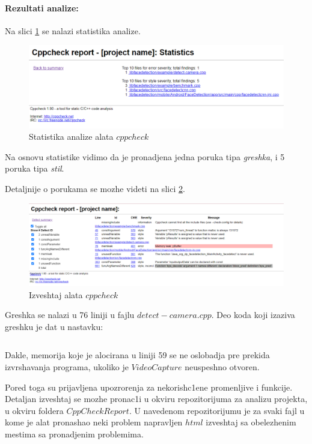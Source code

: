 \documentclass{article}
\begin{document}
\paragraph{Rezultati analize:}
Na slici \ref{stats:cppcheck} se nalazi statistika analize.

\begin{figure}[H]
    \centering
    \includegraphics[width=12cm]{img/cppCheck/cppCheckStats.png}
    \caption{Statistika analize alata $cppcheck$}
    \label{stats:cppcheck}
\end{figure}
Na osnovu statistike vidimo da je pronadjena jedna poruka tipa \textit{greshka}, i 5 poruka tipa \textit{stil}.

Detaljnije o porukama se mozhe videti na slici \ref{html:cppcheck}.
\begin{figure}[H]
    \centering
    \includegraphics[width=12cm]{img/cppCheck/cppChechHtmlReport.png}
    \caption{Izveshtaj alata $cppcheck$}
    \label{html:cppcheck}
\end{figure}

Greshka se nalazi u 76 liniji u fajlu $detect-camera.cpp$. Deo koda koji izaziva greshku je dat u nastavku:
\selectfont

\inputminted[frame=lines,
framesep=2mm,
baselinestretch=1.2,
bgcolor=LightGray,
fontsize=\footnotesize,
firstline=55,
lastline=77,
linenos
]{cpp}{detect-camera.cpp}

\selectfont
Dakle, memorija koje je alocirana u liniji 59 se ne oslobadja pre prekida izvrshavanja programa, ukoliko je $VideoCapture$ neuspeshno otvoren.

Pored toga su prijavljena upozrorenja za nekorish\-c1ene promenljive i funkcije. Detaljan izveshtaj se mozhe pronac1i u okviru repozitorijuma za analizu projekta, u okviru foldera $CppCheckReport.$ U navedenom repozitorijumu je za svaki fajl u kome je alat pronashao neki problem napravljen $html$ izveshtaj sa obelezhenim mestima sa pronadjenim problemima.
\end{document}
